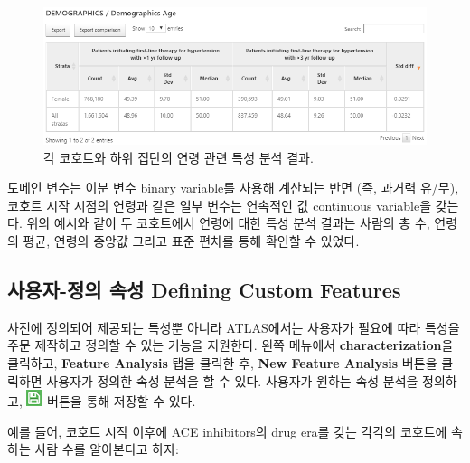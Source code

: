 \documentclass[10.5pt]{book}
\theoremstyle{definition}
\theoremstyle{definition}
\theoremstyle{definition}
\theoremstyle{remark}
\begin{document}
\begin{figure}

{\centering \includegraphics[width=1\linewidth]{images/Characterization/atlasCharacterizationResultsContinuous} 

}

\caption{각 코호트와 하위 집단의 연령 관련 특성 분석 결과.}\label{fig:atlasCharacterizationResultsContinuous}
\end{figure}

도메인 변수는 이분 변수 binary variable를 사용해 계산되는 반면 (즉,
과거력 유/무), 코호트 시작 시점의 연령과 같은 일부 변수는 연속적인 값
continuous variable을 갖는다. 위의 예시와 같이 두 코호트에서 연령에 대한
특성 분석 결과는 사람의 총 수, 연령의 평균, 연령의 중앙값 그리고 표준
편차를 통해 확인할 수 있었다.

\subsection{사용자-정의 속성 Defining Custom
Features}\label{---defining-custom-features}

사전에 정의되어 제공되는 특성뿐 아니라 ATLAS에서는 사용자가 필요에 따라
특성을 주문 제작하고 정의할 수 있는 기능을 지원한다. 왼쪽 메뉴에서
\textbf{characterization}을 클릭하고, \textbf{Feature Analysis} 탭을
클릭한 후, \textbf{New Feature Analysis} 버튼을 클릭하면 사용자가 정의한
속성 분석을 할 수 있다. 사용자가 원하는 속성 분석을 정의하고,
\includegraphics{images/PopulationLevelEstimation/save.png} 버튼을 통해
저장할 수 있다. 

예를 들어, 코호트 시작 이후에 ACE inhibitors의 drug era를 갖는 각각의
코호트에 속하는 사람 수를 알아본다고 하자:
\end{document}
